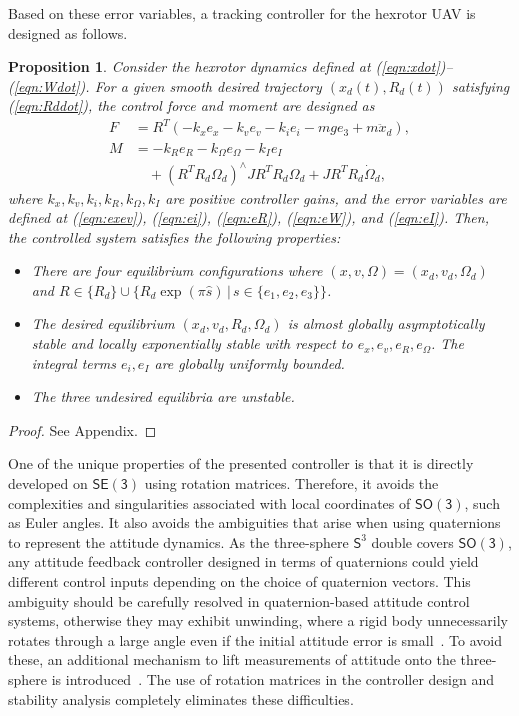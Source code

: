 \documentclass[twocolumn,letterpaper]{IEEEAerospaceCLS}  %
\newcommand{\refeqn}[1]{(\ref{eqn:#1})}
\newcommand{\SO}{\ensuremath{\mathsf{SO(3)}}}
\newcommand{\SE}{\ensuremath{\mathsf{SE(3)}}}
\renewcommand{\Re}{\mathbb{R}}
\newcommand{\Sph}{\ensuremath{\mathsf{S}}}
\newtheorem{prop}{Proposition}
\begin{document}
Based on these error variables, a tracking controller for the hexrotor UAV is designed as follows.
\begin{prop}
Consider the hexrotor dynamics defined at \refeqn{xdot}--\refeqn{Wdot}. For a given smooth desired trajectory $(x_d(t),R_d(t))$ satisfying \refeqn{Rddot}, the control force and moment are designed as
\begin{align}
F &= R^T(-k_x e_x-k_v e_v -k_i e_i-mge_3+m\ddot x_d),\label{eqn:F}\\
M &= -k_R e_R -k_\Omega e_\Omega -k_I e_I\nonumber\\
&\quad +(R^TR_d\Omega_d)^\wedge J R^T R_d \Omega_d + J R^T R_d\dot\Omega_d,\label{eqn:M}
\end{align}
where $k_x,k_v,k_i,k_R,k_\Omega,k_I$ are positive controller gains, and the error variables are defined at \refeqn{exev}, \refeqn{ei}, \refeqn{eR}, \refeqn{eW}, and \refeqn{eI}. Then, the controlled system satisfies the following properties:
\begin{itemize}
\item[(i)] There are four equilibrium configurations where $(x,v,\Omega)=(x_d,v_d,\Omega_d)$ and $R\in\{R_d\}\cup\{R_d\exp (\pi \hat s)\,|\, s\in\{e_1,e_2,e_3\}\}$.%
\item[(ii)] The desired equilibrium $(x_d,v_d,R_d,\Omega_d)$ is almost globally asymptotically stable and locally exponentially stable with respect to $e_x,e_v,e_R,e_\Omega$. The integral terms $e_i,e_I$ are globally uniformly bounded.
\item[(iii)] The three undesired equilibria are unstable.
\end{itemize}

\end{prop}

\begin{proof}
See Appendix.
\end{proof}


One of the unique properties of the presented controller is that it is directly developed on $\SE$ using rotation matrices. Therefore, it avoids the complexities and singularities associated with local coordinates of $\SO$, such as Euler angles. It also avoids the ambiguities that arise when using quaternions to represent the attitude dynamics. As the three-sphere $\Sph^3$ double covers $\SO$, any attitude feedback controller designed in terms of quaternions could yield different control inputs depending on the choice of quaternion vectors. This ambiguity should be carefully resolved in quaternion-based attitude control systems, otherwise they may exhibit unwinding, where a rigid body unnecessarily rotates through a large angle even if the initial attitude error is small~\cite{BhaBerSCL00}. To avoid these, an additional mechanism to lift measurements of attitude onto the three-sphere is introduced~\cite{MaySanITAC11}. The use of rotation matrices in the controller design and stability analysis completely eliminates these difficulties.
\end{document}
